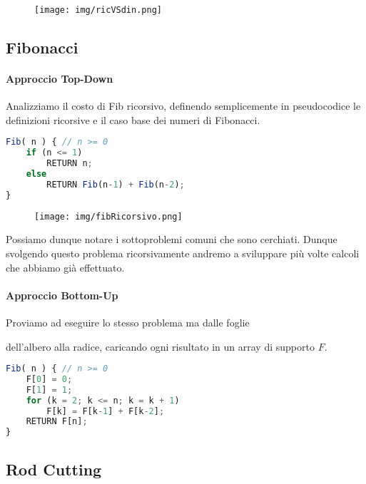 \documentclass{article}
\begin{document}
\begin{figure}[htbp]
        \center
        \texttt{[image: img/ricVSdin.png]}
    \end{figure}

\newpage

\subsection{Fibonacci}

\paragraph{Approccio Top-Down}

Analizziamo il costo di Fib ricorsivo, definendo semplicemente in pseudocodice le definizioni ricorsive e il caso base dei numeri di Fibonacci.

\begin{lstlisting}[language=JavaScript]
Fib( n ) { // n >= 0
    if (n <= 1)
        RETURN n;
    else
        RETURN Fib(n-1) + Fib(n-2);
}
\end{lstlisting}

\begin{figure}[htbp]
        \center
        \texttt{[image: img/fibRicorsivo.png]}
    \end{figure}

Possiamo dunque notare i sottoproblemi comuni che sono cerchiati. Dunque svolgendo questo problema ricorsivamente andremo a sviluppare più volte calcoli che abbiamo già effettuato.

\paragraph{Approccio Bottom-Up} Proviamo ad eseguire lo stesso problema ma dalle foglie 

dell'albero alla radice, caricando ogni risultato in un array di supporto $F$.

\begin{lstlisting}[language=JavaScript]
Fib( n ) { // n >= 0
    F[0] = 0;
    F[1] = 1;
    for (k = 2; k <= n; k = k + 1)
        F[k] = F[k-1] + F[k-2];
    RETURN F[n];
}
\end{lstlisting}

\newpage

\subsection{Rod Cutting}
\end{document}

